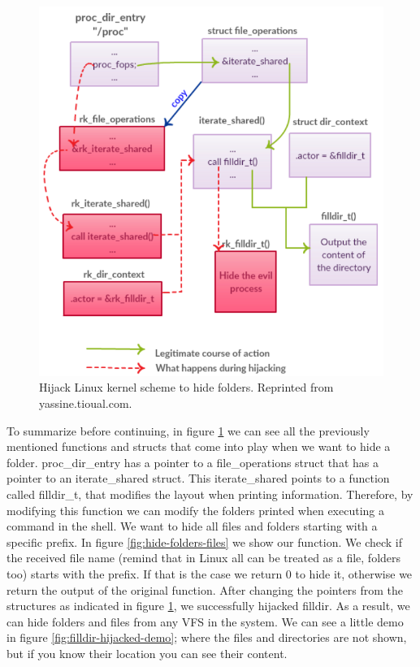 \documentclass[11pt, a4paper,twoside]{tesi_upf}
\begin{document}
\begin{figure}
    \centering
    \includegraphics[width=\linewidth]{images/root-map.png}
    \caption{Hijack Linux kernel scheme to hide folders. Reprinted from yassine.tioual.com. \cite{rootkit-folder}}
    \label{fig:scheme-hide-folder}
\end{figure}

\clearpage
To summarize before continuing, in figure \ref{fig:scheme-hide-folder} we can see all the previously mentioned functions and structs that come into play when we want to hide a folder. proc\_dir\_entry has a pointer to a file\_operations struct that has a pointer to an iterate\_shared struct. This iterate\_shared points to a function called filldir\_t, that modifies the layout when printing information. Therefore, by modifying this function we can modify the folders printed when executing a command in the shell. We want to hide all files and folders starting with a specific prefix. In figure  \ref{fig:hide-folders-files} we show our function. We check if the received file name (remind that in Linux all can be treated as a file, folders too) starts with the prefix. If that is the case we return 0 to hide it, otherwise we return the output of the original function. After changing the pointers from the structures as indicated in figure \ref{fig:scheme-hide-folder}, we successfully hijacked filldir. As a result, we can hide folders and files from any VFS in the system. We can see a little demo in figure \ref{fig:filldir-hijacked-demo}; where the files and directories are not shown, but if you know their location you can see their content.
\end{document}
